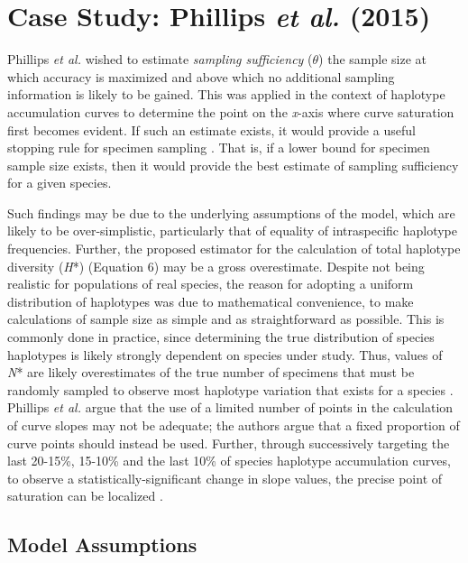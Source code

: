 \section{Case Study: Phillips \textit{et al.} (2015)}

Phillips \textit{et al.} \cite{phillips2015exploration} wished to estimate \textit{sampling sufficiency} ($\theta$) \textemdash \hspace{1mm} the sample size at which accuracy is maximized and above which no additional sampling information is likely to be gained. This was applied in the context of haplotype accumulation curves to determine the point on the \textit{x}-axis where curve saturation first becomes evident. If such an estimate exists, it would provide a useful stopping rule for specimen sampling \cite{phillips2015exploration}. That is, if a lower bound for specimen sample size exists, then it would provide the best estimate of sampling sufficiency for a given species.

 Such findings may be due to the underlying assumptions of the model, which are likely to be over-simplistic, particularly that of equality of intraspecific haplotype frequencies. Further, the proposed estimator for the calculation of total haplotype diversity (\textit{H}*) (Equation 6) may be a gross overestimate. Despite not being realistic for populations of real species, the reason for adopting a uniform distribution of haplotypes was due to mathematical convenience, to make calculations of sample size as simple and as straightforward as possible. This is commonly done in practice, since determining the true distribution of species haplotypes is likely strongly dependent on species under study. Thus, values of \textit{N}* are likely overestimates of the true number of specimens that must be randomly sampled to observe most haplotype variation that exists for a species \cite{phillips2015exploration}. Phillips \textit{et al.} \cite{phillips2015exploration} argue that the use of a limited number of points in the calculation of curve slopes may not be adequate; the authors argue that a fixed proportion of curve points should instead be used. Further, through successively targeting the last 20-15\%, 15-10\% and the last 10\% of species haplotype accumulation curves, to observe a statistically-significant change in slope values, the precise point of saturation can be localized \cite{phillips2015exploration}.


\subsection{Model Assumptions}

